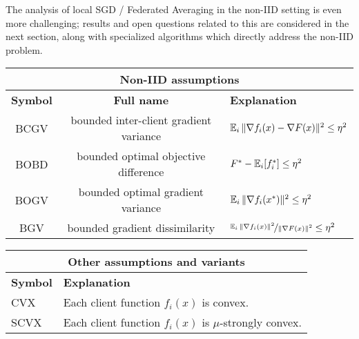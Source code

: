 

The analysis of local SGD / Federated Averaging in the non-IID setting is even more challenging; results and open questions related to this are considered in the next section, along with specialized algorithms which directly address the non-IID problem.


\begin{table}
\renewcommand{\arraystretch}{1.1}
\begin{center}
\begin{tabularx}{\textwidth}{ccX}
\multicolumn{3}{c}{\textbf{Non-IID assumptions}} \\
\toprule
\textbf{Symbol} & \textbf{Full name} & \textbf{Explanation} \\
\midrule
  BCGV &  bounded inter-client gradient variance & $\operatorname*{\mathbb{E}}_i \|\nabla f_i(x) - \nabla F(x) \|^2 \leq \eta^2 $ \\
  BOBD & bounded optimal objective difference & $F^* - \operatorname*{\mathbb{E}}_i[f^*_i] \leq \eta^2 $\\
  BOGV & bounded optimal gradient variance & $\operatorname*{\mathbb{E}}_i \|\nabla f_i(x^*) \|^2 \leq \eta^2$ \\
  BGV & bounded gradient dissimilarity & $\nicefrac{\operatorname*{\mathbb{E}}_i \|\nabla f_i(x) \|^2}{\|\nabla F(x) \|^2} \leq \eta^2$ \\
\bottomrule
\end{tabularx}
\vspace{0.5cm}
\begin{tabularx}{\textwidth}{lX}
\\
\multicolumn{2}{c}{\textbf{Other assumptions and variants}} \\
\toprule
\textbf{Symbol} & \textbf{Explanation} \\
\midrule
  CVX &  Each client function $f_i(x)$ is convex.   \\
  SCVX & Each client function $f_i(x)$ is $\mu$-strongly convex. \\

\end{tabularx}
\end{center}
\end{table}
